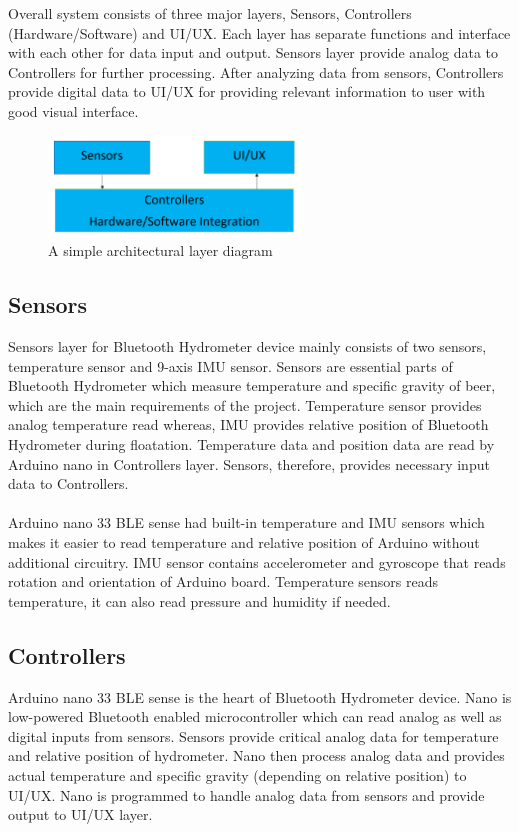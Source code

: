 Overall system consists of three major layers, Sensors, Controllers (Hardware/Software) and UI/UX. Each layer has separate functions and interface with each other for data input and output. Sensors layer provide analog data to Controllers for further processing. After analyzing data from sensors, Controllers provide digital data to UI/UX for providing relevant information to user with good visual interface.

\begin{figure}[h!]
	\centering
 	\includegraphics[width=0.60\textwidth]{images/bluetooth_hydrometer_layers}
 \caption{A simple architectural layer diagram}
\end{figure}

\subsection{Sensors}
Sensors layer for Bluetooth Hydrometer device mainly consists of two sensors, temperature sensor and 9-axis IMU sensor. Sensors are essential parts of Bluetooth Hydrometer which measure temperature and specific gravity of beer, which are the main requirements of the project. Temperature sensor provides analog temperature read whereas, IMU provides relative position of Bluetooth Hydrometer during floatation. Temperature data and position data are read by Arduino nano in Controllers layer. Sensors, therefore, provides necessary input data to Controllers.
\\\\
Arduino nano 33 BLE sense had built-in temperature and IMU sensors which makes it easier to read temperature and relative position of Arduino without additional circuitry. IMU sensor contains accelerometer and gyroscope that reads rotation and orientation of Arduino board.  Temperature sensors reads temperature, it can also read pressure and humidity if needed.
\subsection{Controllers}
Arduino nano 33 BLE sense is the heart of Bluetooth Hydrometer device. Nano is low-powered Bluetooth enabled microcontroller which can read analog as well as digital inputs from sensors. Sensors provide critical analog data for temperature and relative position of hydrometer. Nano then process analog data and provides actual temperature and specific gravity (depending on relative position) to UI/UX. Nano is programmed to handle analog data from sensors and provide output to UI/UX layer.
